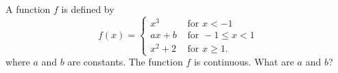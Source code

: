 A function $f$ is defined by 
\[
f(x)= \begin{cases}
  x^3 & \text{ for } x<-1\\
  ax+b & \text{ for } -1 \leq x <1\\
  x^2 +2 & \text{ for } x \geq 1.
\end{cases}
\]
where $a$ and $b$ are constants.  The function $f$ is continuous. What
are $a$ and $b$?\answercheck
